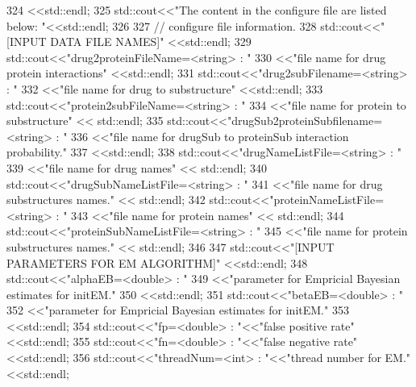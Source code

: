 \begin{DoxyCode}
324              <<std::endl;
325     std::cout<<\textcolor{stringliteral}{"The content in the configure file are listed below: "}<<std::endl;
326 
327     \textcolor{comment}{// configure file information.}
328     std::cout<<\textcolor{stringliteral}{"[INPUT DATA FILE NAMES]"} <<std::endl;
329     std::cout<<\textcolor{stringliteral}{"drug2proteinFileName=<string> : "}
330              <<\textcolor{stringliteral}{"file name for drug protein interactions"} <<std::endl;
331     std::cout<<\textcolor{stringliteral}{"drug2subFilename=<string> : "}
332              <<\textcolor{stringliteral}{"file name for drug to substructure"} <<std::endl;
333     std::cout<<\textcolor{stringliteral}{"protein2subFileName=<string> : "}
334              <<\textcolor{stringliteral}{"file name for protein to substructure"} << std::endl;
335     std::cout<<\textcolor{stringliteral}{"drugSub2proteinSubfilename=<string> : "}
336              <<\textcolor{stringliteral}{"file name for drugSub to proteinSub interaction probability."}
337              <<std::endl;
338     std::cout<<\textcolor{stringliteral}{"drugNameListFile=<string> : "}
339              <<\textcolor{stringliteral}{"file name for drug names"} << std::endl;
340     std::cout<<\textcolor{stringliteral}{"drugSubNameListFile=<string> : "}
341              <<\textcolor{stringliteral}{"file name for drug substructures names."} << std::endl;
342     std::cout<<\textcolor{stringliteral}{"proteinNameListFile=<string> : "}
343              <<\textcolor{stringliteral}{"file name for protein names"} << std::endl;
344     std::cout<<\textcolor{stringliteral}{"proteinSubNameListFile=<string> : "}
345              <<\textcolor{stringliteral}{"file name for protein substructures names."} << std::endl;
346 
347     std::cout<<\textcolor{stringliteral}{"[INPUT PARAMETERS FOR EM ALGORITHM]"} <<std::endl;
348     std::cout<<\textcolor{stringliteral}{"alphaEB=<double> : "}
349              <<\textcolor{stringliteral}{"parameter for Empricial Bayesian estimates for initEM."}
350              <<std::endl;
351     std::cout<<\textcolor{stringliteral}{"betaEB=<double> : "}
352              <<\textcolor{stringliteral}{"parameter for Empricial Bayesian estimates for initEM."}
353              <<std::endl;
354     std::cout<<\textcolor{stringliteral}{"fp=<double> : "}<<\textcolor{stringliteral}{"false positive rate"}<<std::endl;
355     std::cout<<\textcolor{stringliteral}{"fn=<double> : "}<<\textcolor{stringliteral}{"false negative rate"}<<std::endl;
356     std::cout<<\textcolor{stringliteral}{"threadNum=<int> : "}<<\textcolor{stringliteral}{"thread number for EM."} <<std::endl;

\end{DoxyCode}
